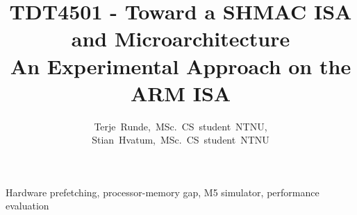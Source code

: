 \documentclass[journal]{IEEEtran}
\begin{document}
\title{\small{TDT4501 - Toward a SHMAC ISA and Microarchitecture}\\\Huge{An Experimental Approach on the ARM ISA}}

\author{Terje~Runde,~MSc.~CS~student~NTNU,
        Stian~Hvatum,~MSc.~CS~student~NTNU}


\maketitle



\begin{IEEEkeywords}
Hardware prefetching, processor-memory gap, M5 simulator, performance evaluation
\end{IEEEkeywords}










\end{document}
